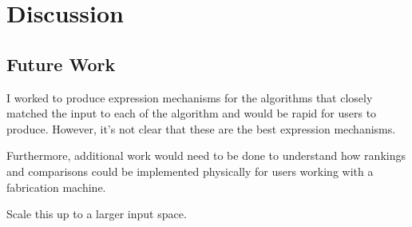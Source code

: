 \section{Discussion}

\subsection{Future Work}

I worked to produce expression mechanisms for the algorithms that closely matched the input to each of the algorithm and would be rapid for users to produce.
However, it's not clear that these are the best expression mechanisms.

Furthermore, additional work would need to be done to understand how rankings and comparisons could be implemented physically for users working with a fabrication machine.

Scale this up to a larger input space.

